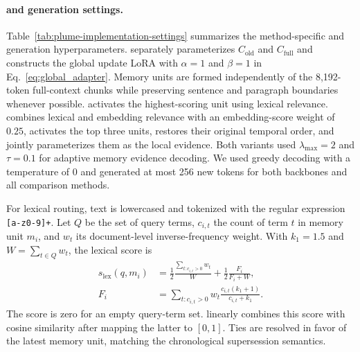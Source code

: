 \paragraph{\method{} and generation settings.}
Table~\ref{tab:plume-implementation-settings} summarizes the method-specific and generation hyperparameters.
\method{} separately parameterizes $C_{\mathrm{old}}$ and $C_{\mathrm{full}}$ and constructs the global update LoRA with $\alpha=1$ and $\beta=1$ in Eq.~\ref{eq:global_adapter}. Memory units are formed independently of the 8,192-token full-context chunks while preserving sentence and paragraph boundaries whenever possible. \methodlexical{} activates the highest-scoring unit using lexical relevance. \methodhybrid{} combines lexical and embedding relevance with an embedding-score weight of $0.25$, activates the top three units, restores their original temporal order, and jointly parameterizes them as the local evidence. Both variants used $\lambda_{\max}=2$ and $\tau=0.1$ for adaptive memory evidence decoding. We used greedy decoding with a temperature of 0 and generated at most 256 new tokens for both backbones and all comparison methods.

For lexical routing, text is lowercased and tokenized with the regular expression \texttt{[a-z0-9]+}. Let $Q$ be the set of query terms, $c_{i,t}$ the count of term $t$ in memory unit $m_i$, and $w_t$ its document-level inverse-frequency weight. With $k_1=1.5$ and $W=\sum_{t\in Q}w_t$, the lexical score is
\begin{equation}
\begin{aligned}
s_{\mathrm{lex}}(q,m_i)
&=\frac{1}{2}\frac{\sum_{t:c_{i,t}>0}w_t}{W}
  +\frac{1}{2}\frac{F_i}{F_i+W}, \\
F_i
&=\sum_{t:c_{i,t}>0}w_t
  \frac{c_{i,t}(k_1+1)}{c_{i,t}+k_1}.
\end{aligned}
\label{eq:lexical-router}
\end{equation}
The score is zero for an empty query-term set. \methodhybrid{} linearly combines this score with cosine similarity after mapping the latter to $[0,1]$. Ties are resolved in favor of the latest memory unit, matching the chronological supersession semantics.

